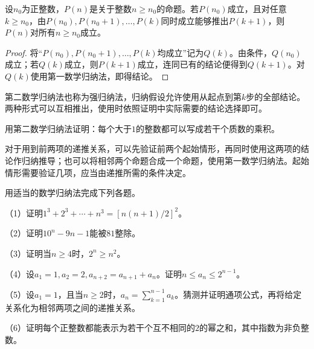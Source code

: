 \begin{theorem}[第二数学归纳法]
\label{thm:analysis-strong-induction}
设\(n_0\)为正整数，\(P(n)\)是关于整数\(n\ge n_0\)的命题。若\(P(n_0)\)成立，且对任意\(k\ge n_0\)，由\(P(n_0),P(n_0+1),\ldots,P(k)\)同时成立能够推出\(P(k+1)\)，则\(P(n)\)对所有\(n\ge n_0\)成立。
\end{theorem}

\begin{proof}
将“\(P(n_0),P(n_0+1),\ldots,P(k)\)均成立”记为\(Q(k)\)。由条件，\(Q(n_0)\)成立；若\(Q(k)\)成立，则\(P(k+1)\)成立，连同已有的结论便得到\(Q(k+1)\)。对\(Q(k)\)使用第一数学归纳法，即得结论。
\end{proof}

第二数学归纳法也称为{\heiti{}强归纳法}，归纳假设允许使用从起点到第\(k\)步的全部结论。两种形式可以互相推出，使用时依照证明中实际需要的结论选择即可。

\begin{example}
用第二数学归纳法证明：每个大于\(1\)的整数都可以写成若干个质数的乘积。
\end{example}

对于用到前两项的递推关系，可以先验证前两个起始情形，再同时使用这两项的结论作归纳推导；也可以将相邻两个命题合成一个命题，使用第一数学归纳法。起始情形需要验证几项，应当由递推所需的条件决定。

\begin{exercise}
\label{ex:analysis-induction}
用适当的数学归纳法完成下列各题。

（1）证明\(1^3+2^3+\cdots+n^3=[n(n+1)/2]^2\)。

（2）证明\(10^n-9n-1\)能被\(81\)整除。

（3）证明当\(n\ge4\)时，\(2^n\ge n^2\)。

（4）设\(a_1=1,a_2=2,a_{n+2}=a_{n+1}+a_n\)。证明\(n\le a_n\le2^{n-1}\)。

（5）设\(a_1=1\)，且当\(n\ge2\)时，\(a_n=\sum_{k=1}^{n-1}a_k\)。猜测并证明通项公式，再将给定关系化为相邻两项之间的递推关系。

（6）证明每个正整数都能表示为若干个互不相同的\(2\)的幂之和，其中指数为非负整数。
\end{exercise}
